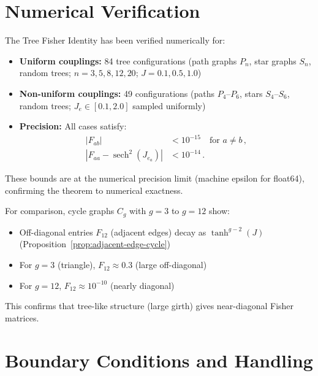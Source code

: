 \documentclass[11pt]{article}
\theoremstyle{definition}
\theoremstyle{remark}
\begin{document}
\section{Numerical Verification}

The Tree Fisher Identity has been verified numerically for:

\begin{itemize}
\item \textbf{Uniform couplings:} 84 tree configurations (path graphs
$P_n$, star graphs $S_n$, random trees; $n = 3, 5, 8, 12, 20$;
$J = 0.1, 0.5, 1.0$)

\item \textbf{Non-uniform couplings:} 49 configurations (paths $P_4$--$P_6$,
stars $S_4$--$S_6$, random trees; $J_e \in [0.1, 2.0]$ sampled uniformly)

\item \textbf{Precision:} All cases satisfy:
\begin{align}
|F_{ab}| &< 10^{-15} \quad \text{for } a \neq b\,, \\
|F_{aa} - \operatorname{sech}^2(J_{e_a})| &< 10^{-14}\,.
\end{align}
\end{itemize}

These bounds are at the numerical precision limit (machine epsilon for
float64), confirming the theorem to numerical exactness.

For comparison, cycle graphs $C_g$ with $g = 3$ to $g = 12$ show:
\begin{itemize}
\item Off-diagonal entries $F_{12}$ (adjacent edges) decay as
$\tanh^{g-2}(J)$ (Proposition~\ref{prop:adjacent-edge-cycle})

\item For $g = 3$ (triangle), $F_{12} \approx 0.3$ (large off-diagonal)

\item For $g = 12$, $F_{12} \approx 10^{-10}$ (nearly diagonal)
\end{itemize}

This confirms that tree-like structure (large girth) gives near-diagonal
Fisher matrices.

\section{Boundary Conditions and Handling}
\end{document}
